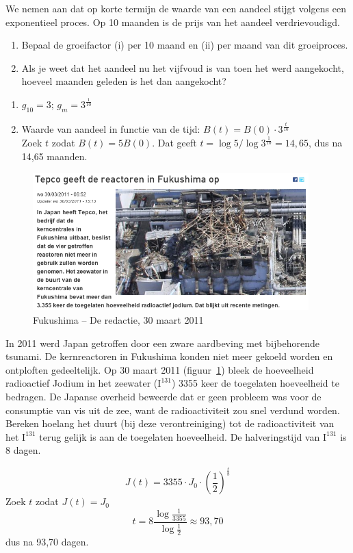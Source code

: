 \begin{oef}
We nemen aan dat op korte termijn de waarde van een aandeel stijgt
volgens een exponentieel  proces. Op 10 maanden is de prijs van
het aandeel verdrievoudigd.
\begin{enumerate}
  \item Bepaal de groeifactor (i) per 10 maand en (ii) per maand van dit groeiproces.
  \item Als je weet dat het aandeel nu het vijfvoud is van
        toen het werd aangekocht, hoeveel maanden geleden is het dan
        aangekocht?
\end{enumerate}
\begin{opl}
  \begin{enumerate}
    \item $g_{10}=3$; $g_m=3^\frac{1}{10}$
    \item Waarde van aandeel in functie van de tijd: $B(t)=B(0)\cdot 3^\frac{t}{10}$ \\
          Zoek $t$ zodat $B(t)=5B(0)$. Dat geeft $t=\log5/\log3^\frac{1}{10}=14,65$, dus na 14,65 maanden.
  \end{enumerate}
\end{opl}
\end{oef}

 
\begin{figure}[hbtp]
  \flushright
  \includegraphics[width=0.95\textwidth]{oefeningen/jodiumderedactie.png}
  \caption{Fukushima -- De redactie, 30 maart 2011}
  \label{fig:fukushima} 
\end{figure}    

\begin{oef}
In 2011 werd Japan getroffen door een zware aardbeving met bijbehorende tsunami. De kernreactoren in Fukushima konden niet meer gekoeld worden en ontploften gedeeltelijk. Op 30 maart 2011 (figuur~\ref{fig:fukushima}) bleek de hoeveelheid radioactief Jodium in het zeewater ($\text{I}^{131}$) 3355 keer de toegelaten hoeveelheid te bedragen. 
De Japanse overheid beweerde dat er geen probleem was voor de consumptie van vis uit de zee, want de radioactiviteit zou snel verdund worden. Bereken hoelang het duurt (bij deze verontreiniging) tot de radioactiviteit van het $\text{I}^{131}$ terug gelijk is aan de toegelaten hoeveelheid. De halveringstijd van $\text{I}^{131}$ is 8 dagen.
\begin{opl}
\[
  J(t)=3355\cdot J_0\cdot \left( \frac12\right)^\frac{t}{8}
\]
Zoek $t$ zodat $J(t)=J_0$
\[
  t=8\frac{\log \frac{1}{3355}}{\log\frac12}\approx93,70
\]
dus na 93,70 dagen.
\end{opl}
\end{oef}


